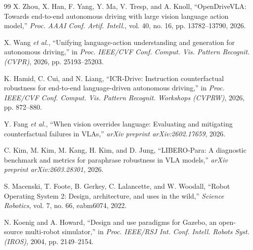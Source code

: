\documentclass[letterpaper,conference]{IEEEtran}
\begin{document}
\begin{thebibliography}{99}
X. Zhou, X. Han, F. Yang, Y. Ma, V. Tresp, and A. Knoll,
``OpenDriveVLA: Towards end-to-end autonomous driving with large vision
language action model,'' \emph{Proc. AAAI Conf. Artif. Intell.}, vol. 40,
no. 16, pp. 13782--13790, 2026.

X. Wang \emph{et al.}, ``Unifying language-action understanding and generation
for autonomous driving,'' in \emph{Proc. IEEE/CVF Conf. Comput. Vis. Pattern
Recognit. (CVPR)}, 2026, pp. 25193--25203.

K. Hamid, C. Cui, and N. Liang,
``ICR-Drive: Instruction counterfactual robustness for end-to-end language-driven
autonomous driving,'' in \emph{Proc. IEEE/CVF Conf. Comput. Vis. Pattern
Recognit. Workshops (CVPRW)}, 2026, pp. 872--880.

Y. Fang \emph{et al.},
``When vision overrides language: Evaluating and mitigating counterfactual
failures in VLAs,''
\emph{arXiv preprint arXiv:2602.17659}, 2026.

C. Kim, M. Kim, M. Kang, H. Kim, and D. Jung,
``LIBERO-Para: A diagnostic benchmark and metrics for paraphrase robustness in
VLA models,''
\emph{arXiv preprint arXiv:2603.28301}, 2026.

S. Macenski, T. Foote, B. Gerkey, C. Lalancette, and W. Woodall,
``Robot Operating System 2: Design, architecture, and uses in the wild,''
\emph{Science Robotics}, vol. 7, no. 66, eabm6074, 2022.

N. Koenig and A. Howard, ``Design and use paradigms for Gazebo, an open-source
multi-robot simulator,'' in \emph{Proc. IEEE/RSJ Int. Conf. Intell. Robots
Syst. (IROS)}, 2004, pp. 2149--2154.

\end{thebibliography}
\end{document}
